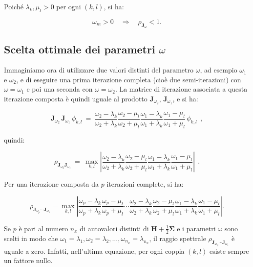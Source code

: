 Poiché \(\lambda_k, \mu_l > 0\) per ogni \((k,l)\), si ha:

\[
\omega_m > 0 \quad \Rightarrow \quad \rho_{\mathbf{J}_{\omega}} < 1.
\]

\subsection{Scelta ottimale dei parametri \(\omega\)}

Immaginiamo ora di utilizzare due valori distinti del parametro \(\omega\), ad esempio \(\omega_1\) e \(\omega_2\), e di eseguire una prima iterazione completa (cioè due semi-iterazioni) con \(\omega = \omega_1\) e poi una seconda con \(\omega = \omega_2\).
La matrice di iterazione associata a questa iterazione composta è quindi uguale al prodotto \(\mathbf{J}_{\omega_2},\, \mathbf{J}_{\omega_1}\), e si ha:

\[
\mathbf{J}_{\omega_2}\, \mathbf{J}_{\omega_1}\, \phi_{k,l}\ =\ \frac{\omega_2 - \lambda_k}{\omega_2 + \lambda_k} \frac{\omega_2 - \mu_l}{\omega_2 + \mu_l} \frac{\omega_1 - \lambda_k}{\omega_1 + \lambda_k} \frac{\omega_1 - \mu_l}{\omega_1 + \mu_l}\, \phi_{k,l}\ \ ,
\]

quindi:

\[
\rho_{\mathbf{J}_{\omega_2} \mathbf{J}_{\omega_1}}\ =\ \max_{k,l} \left| \frac{\omega_2 - \lambda_k}{\omega_2 + \lambda_k} \frac{\omega_2 - \mu_l}{\omega_2 + \mu_l} \frac{\omega_1 - \lambda_k}{\omega_1 + \lambda_k} \frac{\omega_1 - \mu_l}{\omega_1 + \mu_l} \right|\ \ .
\]

Per una iterazione composta da \(p\) iterazioni complete, si ha:

\[
\rho_{\mathbf{J}_{\omega_p} \cdots \mathbf{J}_{\omega_1}} = \max_{k,l} \left| \frac{\omega_p - \lambda_k}{\omega_p + \lambda_k} \frac{\omega_p - \mu_l}{\omega_p + \mu_l} \cdots \frac{\omega_2 - \lambda_k}{\omega_2 + \lambda_k} \frac{\omega_2 - \mu_l}{\omega_2 + \mu_l} \frac{\omega_1 - \lambda_k}{\omega_1 + \lambda_k} \frac{\omega_1 - \mu_l}{\omega_1 + \mu_l} \right|. \tag{21}
\]

Se \(p\) è pari al numero \(n_x\) di autovalori distinti di \(\mathbf{H} + \frac{1}{2}\mathbf{\Sigma}\) e i parametri \(\omega\) sono scelti in modo che \(\omega_1 = \lambda_1, \omega_2 = \lambda_2, \dots, \omega_{n_x} = \lambda_{n_x}\), il raggio spettrale \(\rho_{\mathbf{J}_{\omega_p} \cdots \mathbf{J}_{\omega_1}}\) è uguale a zero.
Infatti, nell'ultima equazione, per ogni coppia \((k,l)\) esiste sempre un fattore nullo.

